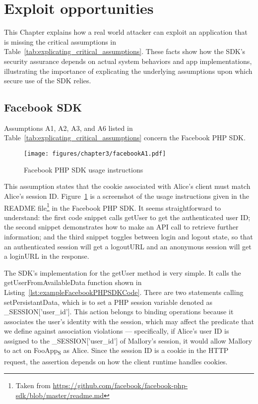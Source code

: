 

\section{Exploit opportunities}
\label{sec:explicating_exploit_opportunities}

This Chapter explains how a real world attacker can exploit an application that is missing the critical assumptions in Table~\ref{tab:explicating_critical_assumptions}.  These facts show how the SDK's security assurance depends on actual system behaviors and app implementations, illustrating the importance of explicating the underlying assumptions upon which secure use of the SDK relies.  

\subsection{Facebook SDK}

Assumptions A1, A2, A3, and A6 listed in Table~\ref{tab:explicating_critical_assumptions} concern the Facebook PHP SDK.

\begin{figure}[hbt]
\centering
\texttt{[image: figures/chapter3/facebookA1.pdf]}
\caption{Facebook PHP SDK usage instructions}
\label{fig:facebookA1}
\end{figure}

  This assumption states that the cookie associated with Alice's client must match Alice's session ID. Figure~\ref{fig:facebookA1} is a screenshot of the usage instructions given in the README file\footnote{Taken from \url{https://github.com/facebook/facebook-php-sdk/blob/master/readme.md}} in the Facebook PHP SDK.  It seems straightforward to understand: the first code snippet calls getUser to get the authenticated user ID; the second snippet demonstrates how to make an API call to retrieve further information; and the third snippet toggles between login and logout state, so that an authenticated session will get a logoutURL and an anonymous session will get a loginURL in the response.

The SDK's implementation for the getUser method is very simple. It calls the getUserFromAvailableData function shown in Listing~\ref{lst:exampleFacebookPHPSDKCode}.  There are two statements calling setPersistantData, which is to set a PHP session variable denoted as \_SESSION['user\_id'].  This action belongs to binding operations because it associates the user's identity with the session, which may affect the predicate that we define against association violations --- specifically, if Alice's user ID is assigned to the \_SESSION['user\_id'] of Mallory's session, it would allow Mallory to act on FooApp\textsubscript{S} as Alice.  Since the session ID is a cookie in the HTTP request, the assertion depends on how the client runtime handles cookies.  

